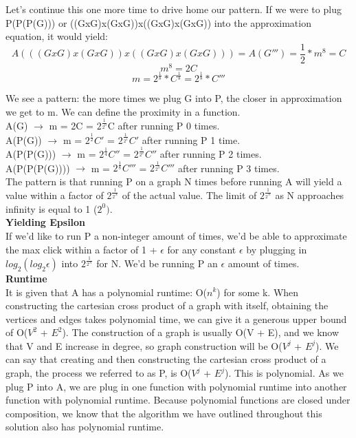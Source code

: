 \documentclass[11pt, solution, letterpaper]{format}
\begin{document}
Let's continue this one more time to drive home our pattern. If we were to plug P(P(P(G))) or ((GxG)x(GxG))x((GxG)x(GxG)) into the approximation equation, it would yield:\\
$$A(((GxG)x(GxG))x((GxG)x(GxG))) = A(G''') = \frac{1}{2}*m^8 = C$$
$$m^8 = 2C$$
$$m = 2^\frac{1}{8} * C^\frac{1}{8} =  2^\frac{1}{8} * C'''$$

We see a pattern: the more times we plug G into P, the closer in approximation we get to m. We can define the proximity in a function.\\

A(G) $\xrightarrow{}$ m = 2C = $2^\frac{1}{2^0}$C after running P 0 times.\\
A(P(G)) $\xrightarrow{}$ m = $2^\frac{1}{2}C'$ = $2^\frac{1}{2^1}C'$ after running P 1 time.\\
A(P(P(G))) $\xrightarrow{}$ m = $2^\frac{1}{4}C''$ = $2^\frac{1}{2^2}C''$ after running P 2 times.\\
A(P(P(P(G)))) $\xrightarrow{}$ m = $2^\frac{1}{8}C'''$ = $2^\frac{1}{2^3}C'''$ after running P 3 times.\\
The pattern is that running P on a graph N times before running A will yield a value within a factor of $2^\frac{1}{2^N}$ of the actual value. The limit of $2^\frac{1}{2^N}$ as N approaches infinity is equal to 1 ($2^0)$.\\

\textbf{Yielding Epsilon}\\
If we'd like to run P a non-integer amount of times, we'd be able to approximate the max click within a factor of 1 + $\epsilon$ for any constant $\epsilon$ by plugging in $log_2 (log_2 \epsilon)$ into $2^\frac{1}{2^N}$ for N. We'd be running P an $\epsilon$ amount of times.\\

\textbf{Runtime}\\
It is given that A has a polynomial runtime: O($n^k$) for some k. When constructing the cartesian cross product of a graph with itself,  obtaining the vertices and edges takes polynomial time, we can give it a generous upper bound of O($V^2$ + $E^2$). The construction of a graph is usually O(V + E), and we know that V and E increase in degree, so graph construction will be O($V^j$ + $E^j$). We can say that creating and then constructing the cartesian cross product of a graph, the process we referred to as P, is O($V^j$ + $E^j$). This is polynomial. As we plug P into A, we are plug in one function with polynomial runtime into another function with polynomial runtime. Because polynomial functions are closed under composition, we know that the algorithm we have outlined throughout this solution also has polynomial runtime. \\
\clearpage
\end{document}

